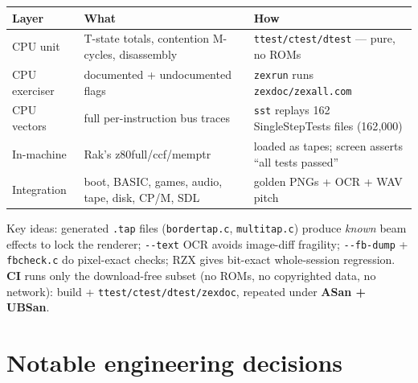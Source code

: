 \documentclass[11pt,a4paper]{article}
\begin{document}
\begin{center}\footnotesize
\begin{tabular}{@{}p{2.6cm}p{5.0cm}p{7.8cm}@{}}
\toprule
\textbf{Layer} & \textbf{What} & \textbf{How} \\
\midrule
CPU unit      & T-state totals, contention M-cycles, disassembly & \texttt{ttest/ctest/dtest} --- pure, no ROMs \\
CPU exerciser & documented + undocumented flags & \texttt{zexrun} runs \texttt{zexdoc/zexall.com} \\
CPU vectors   & full per-instruction bus traces & \texttt{sst} replays 162 SingleStepTests files (162{,}000) \\
In-machine    & Rak's z80full/ccf/memptr & loaded as tapes; screen asserts ``all tests passed'' \\
Integration   & boot, BASIC, games, audio, tape, disk, CP/M, SDL & golden PNGs + OCR + WAV pitch \\
\bottomrule
\end{tabular}
\end{center}

Key ideas: generated \texttt{.tap} files (\texttt{bordertap.c},
\texttt{multitap.c}) produce \emph{known} beam effects to lock the renderer;
\texttt{-{}-text} OCR avoids image-diff fragility; \texttt{-{}-fb-dump} +
\texttt{fbcheck.c} do pixel-exact checks; RZX gives bit-exact whole-session
regression. \textbf{CI} runs only the download-free subset (no ROMs, no
copyrighted data, no network): build + \texttt{ttest/ctest/dtest/zexdoc},
repeated under \textbf{ASan + UBSan}.

\section{Notable engineering decisions}
\end{document}
